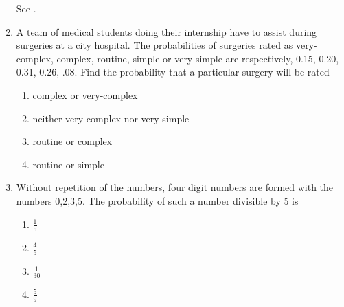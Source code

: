 \begin{enumerate}[label=\thesubsection.\arabic*,ref=\thesubsection.\theenumi,resume*]
See .
\begin{table}[htb]\centering

%	
	\caption{}
\label{tab:ncert/12/13/2/15}
\end{table}	
%
	\item A team of medical students doing their internship have to assist during surgeries at a city hospital. The probabilities of surgeries rated as very-complex, complex, routine, simple or very-simple are respectively, 0.15, 0.20, 0.31, 0.26, .08. Find the probability that a particular surgery will be rated
		\begin{multicols}{2}
\begin{enumerate}
\item complex or very-complex
\item neither very-complex nor very simple
\item routine or complex
\item routine or simple
\end{enumerate}
\end{multicols}
		\solution
		
\begin{table}[htb]\centering
	
	\caption{}
	\label{tab:exemplar/11/16/3/8/table2}
\end{table}	
\item Without repetition of the numbers, four digit numbers are formed with the numbers 0,2,3,5. The
probability of such a number divisible by 5 is
		\begin{multicols}{4}
\begin{enumerate}
\item $\frac{1}{5}$ 
\item $\frac{4}{5}$
\item $\frac{1}{30}$ 
\item $\frac{5}{9}$
\end{enumerate}
		\end{multicols}
\solution

\end{enumerate}
